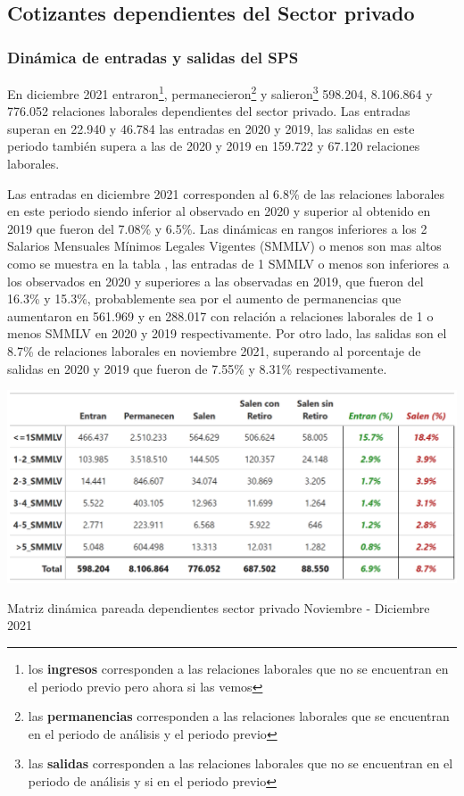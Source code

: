 \FloatBarrier
\subsection{Cotizantes dependientes del Sector privado}
\subsubsection{Dinámica de entradas y salidas del SPS}
En diciembre 2021 entraron\footnote{los \textbf{ingresos} corresponden a las relaciones laborales que no se encuentran en el periodo previo pero ahora si las vemos}, permanecieron\footnote{las \textbf{permanencias} corresponden a las relaciones laborales que se encuentran en el periodo de análisis y el periodo previo} y salieron\footnote{las \textbf{salidas} corresponden a las relaciones laborales que no se encuentran en el periodo de análisis y si en el periodo previo} 598.204, 8.106.864 y 776.052 relaciones laborales dependientes del sector privado. Las entradas superan en 22.940 y 46.784 las entradas en 2020 y 2019, las salidas en este periodo también supera a las de 2020 y 2019 en 159.722 y 67.120 relaciones laborales. 


Las entradas en diciembre 2021 corresponden al 6.8\% de las relaciones laborales en este periodo siendo inferior al observado en 2020 y superior al obtenido en 2019 que fueron del 7.08\% y 6.5\%. Las dinámicas en rangos inferiores a los 2 Salarios Mensuales Mínimos Legales Vigentes (SMMLV) o menos son mas altos como se muestra en la tabla , las entradas de 1 SMMLV o menos son inferiores a los observados en 2020 y superiores a las observadas en 2019, que fueron del 16.3\% y 15.3\%, probablemente sea por el aumento de permanencias que aumentaron en 561.969 y en 288.017 con relación a relaciones laborales de 1 o menos SMMLV en 2020 y 2019 respectivamente. Por otro lado, las salidas son el 8.7\% de relaciones laborales en noviembre 2021, superando al porcentaje de salidas en 2020 y 2019 que fueron de 7.55\% y 8.31\% respectivamente. 

\begin{table}[!htbp]
\label{tabla:sector_privado:matriz_dinamica_mes_12_2021}
\centering
\includegraphics[width = 15cm]{results/02_longitudinal/salida_resumen_dependientes_interes_21.png}
\caption{Matriz dinámica pareada dependientes sector privado Noviembre - Diciembre 2021}%
\end{table}

